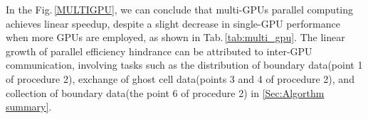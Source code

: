 In the Fig.\,\ref{MULTIGPU}, we can conclude that multi-GPUs parallel computing achieves linear speedup, despite a slight decrease in single-GPU performance when more GPUs are employed, as shown in Tab.\,\ref{tab:multi_gpu}. The linear growth of parallel efficiency hindrance can be attributed to inter-GPU communication, involving tasks such as the distribution of boundary data(point 1 of procedure 2), exchange of ghost cell data(points 3 and 4 of procedure 2), and collection of boundary data(the point 6 of procedure 2) in \ref{Sec:Algorthm summary}.


\begin{table}[H]
\centering
\footnotesize
{}
    \caption{Multi-GPUs execution time vs. single GPU.}
    \label{tab:multi_gpu}
\end{table}

